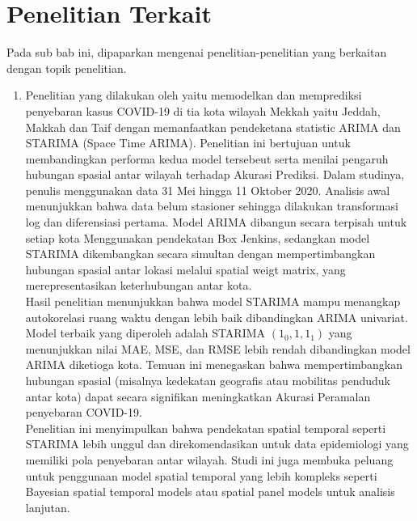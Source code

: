\section{Penelitian Terkait}
Pada sub bab ini, dipaparkan mengenai penelitian-penelitian yang berkaitan dengan topik penelitian.

\begin{enumerate}
    \item Penelitian yang dilakukan oleh \citep{fuad2021covid19} yaitu memodelkan dan memprediksi penyebaran kasus COVID-19 di tia kota wilayah Mekkah yaitu Jeddah, Makkah dan Taif dengan memanfaatkan pendeketana statistic ARIMA dan STARIMA (Space Time ARIMA).
    Penelitian ini bertujuan untuk membandingkan performa kedua model tersebeut serta menilai pengaruh hubungan spasial antar wilayah terhadap Akurasi Prediksi.
    Dalam studinya, penulis menggunakan data 31 Mei hingga 11 Oktober 2020.
    Analisis awal menunjukkan bahwa data belum stasioner sehingga dilakukan transformasi log dan diferensiasi pertama.
    Model ARIMA dibangun secara terpisah untuk setiap kota Menggunakan pendekatan Box Jenkins, sedangkan model STARIMA dikembangkan secara simultan dengan mempertimbangkan hubungan spasial antar lokasi melalui spatial weigt matrix, yang merepresentasikan keterhubungan antar kota. \\
    Hasil penelitian menunjukkan bahwa model STARIMA mampu menangkap autokorelasi ruang waktu dengan lebih baik dibandingkan ARIMA univariat.
    Model terbaik yang diperoleh adalah STARIMA $(1_{0},1,1_{1})$ yang menunjukkan nilai MAE, MSE, dan RMSE lebih rendah dibandingkan model ARIMA diketioga kota.
    Temuan ini menegaskan bahwa mempertimbangkan hubungan spasial (misalnya kedekatan geografis atau mobilitas penduduk antar kota) dapat secara signifikan meningkatkan Akurasi Peramalan penyebaran COVID-19. \\
    Penelitian ini menyimpulkan bahwa pendekatan spatial temporal seperti STARIMA lebih unggul dan direkomendasikan untuk data epidemiologi yang memiliki pola penyebaran antar wilayah.
    Studi ini juga membuka peluang untuk penggunaan model spatial temporal yang lebih kompleks seperti Bayesian spatial temporal models atau spatial panel models untuk analisis lanjutan.


\end{enumerate}
